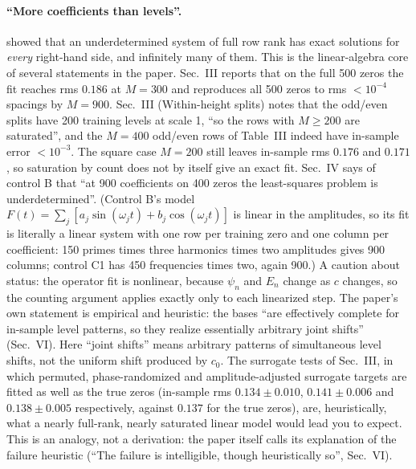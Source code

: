 \paragraph{``More coefficients than levels''.}  showed that an underdetermined system of full row rank has exact solutions for \emph{every} right-hand side, and infinitely many of them. This is the linear-algebra core of several statements in the paper. Sec.~III reports that on the full 500 zeros the fit reaches rms $0.186$ at $M=300$ and reproduces all 500 zeros to rms $<10^{-4}$ spacings by $M=900$. Sec.~III (Within-height splits) notes that the odd/even splits have 200 training levels at scale 1, ``so the rows with $M\ge200$ are saturated'', and the $M=400$ odd/even rows of Table~III indeed have in-sample error $<10^{-3}$. The square case $M=200$ still leaves in-sample rms $0.176$ and $0.171$, so saturation by count does not by itself give an exact fit. Sec.~IV says of control B that ``at 900 coefficients on 400 zeros the least-squares problem is underdetermined''. (Control B's model $F(t)=\sum_j[a_j\sin(\omega_jt)+b_j\cos(\omega_jt)]$ is linear in the amplitudes, so its fit is literally a linear system with one row per training zero and one column per coefficient: 150 primes times three harmonics times two amplitudes gives 900 columns; control C1 has 450 frequencies times two, again 900.) A caution about status: the operator fit is nonlinear, because $\psi_n$ and $E_n$ change as $c$ changes, so the counting argument applies exactly only to each linearized step. The paper's own statement is empirical and heuristic: the bases ``are effectively complete for in-sample level patterns, so they realize essentially arbitrary joint shifts'' (Sec.~VI). Here ``joint shifts'' means arbitrary patterns of simultaneous level shifts, not the uniform shift produced by $c_0$. The surrogate tests of Sec.~III, in which permuted, phase-randomized and amplitude-adjusted surrogate targets are fitted as well as the true zeros (in-sample rms $0.134\pm0.010$, $0.141\pm0.006$ and $0.138\pm0.005$ respectively, against $0.137$ for the true zeros), are, heuristically, what a nearly full-rank, nearly saturated linear model would lead you to expect. This is an analogy, not a derivation: the paper itself calls its explanation of the failure heuristic (``The failure is intelligible, though heuristically so'', Sec.~VI).

